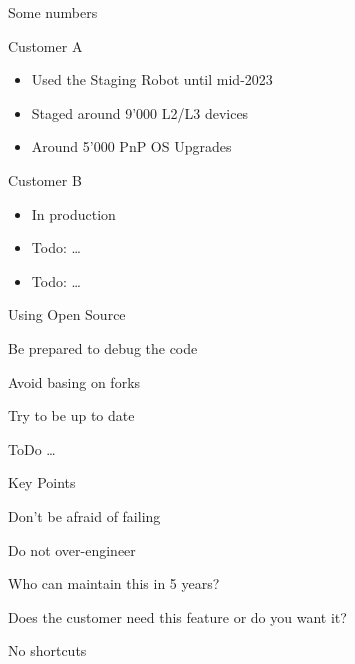 \documentclass[aspectratio=169]{beamer}
\begin{document}


\begin{frame}{Some numbers}

  Customer A
  \begin{itemize}
    \item Used the Staging Robot until mid-2023
    \item Staged around 9'000 L2/L3 devices
    \item Around 5'000 PnP OS Upgrades
  \end{itemize}

  Customer B
  \begin{itemize}
    \item In production
    \item Todo: \dots
    \item Todo: \dots
  \end{itemize}


\end{frame}



\begin{frame}{Using Open Source}

  \begin{vfilleditems}
    \item Be prepared to debug the code
    \item Avoid basing on forks
    \item Try to be up to date
    \item ToDo \dots
  \end{vfilleditems}

\end{frame}


\begin{frame}{Key Points}

  \begin{vfilleditems}
    \item Don't be afraid of failing
    \item Do not over-engineer
    \item Who can maintain this in 5 years?
    \item Does the customer need this feature or do you want it?
    \item No shortcuts
  \end{vfilleditems}

\end{frame}

\end{document}
